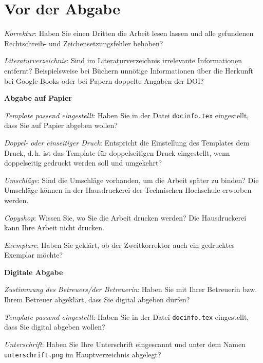 \section{Vor der Abgabe}

\begin{checklist}
  \footnotesize
  \item \textit{Korrektur}: Haben Sie einen Dritten die Arbeit lesen lassen und alle gefundenen Rechtschreib- und Zeichensetzungsfehler behoben?
  \item \textit{Literaturverzeichnis}: Sind im Literaturverzeichnis irrelevante Informationen entfernt? Beispielsweise bei Büchern unnötige Informationen über die Herkunft bei Google-Books oder bei Papern doppelte Angaben der DOI?
  \item \textbf{Abgabe auf Papier}
  \begin{checklist}
    \item \textit{Template passend eingestellt}: Haben Sie in der Datei \texttt{docinfo.tex} eingestellt, dass Sie auf Papier abgeben wollen?
    \item \textit{Doppel- oder einseitiger Druck}: Entspricht die Einstellung des Templates dem Druck, d.\,h. ist das Template für doppelseitigen Druck eingestellt, wenn doppelseitig gedruckt werden soll und umgekehrt?
    \item \textit{Umschläge}: Sind die Umschläge vorhanden, um die Arbeit später zu binden? Die Umschläge können in der Hausdruckerei der Technischen Hochschule erworben werden.
    \item \textit{Copyshop}: Wissen Sie, wo Sie die Arbeit drucken werden? Die Hausdruckerei kann Ihre Arbeit nicht drucken.
    \item \textit{Exemplare}: Haben Sie geklärt, ob der Zweitkorrektor auch ein gedrucktes Exemplar möchte?
  \end{checklist}
  \item \textbf{Digitale Abgabe}
  \begin{checklist}
    \item \textit{Zustimmung des Betreuers/der Betreuerin}: Haben Sie mit Ihrer Betreuerin bzw. Ihrem Betreuer abgeklärt, dass Sie digital abgeben dürfen?
    \item \textit{Template passend eingestellt}: Haben Sie in der Datei \texttt{docinfo.tex} eingestellt, dass Sie digital abgeben wollen?
    \item \textit{Unterschrift}: Haben Sie Ihre Unterschrift eingescannt und unter dem Namen \texttt{unterschrift.png} im Hauptverzeichnis abgelegt?
  \end{checklist}
\end{checklist}
